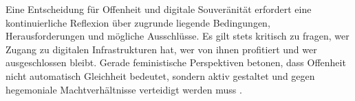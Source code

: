Eine Entscheidung für Offenheit und digitale Souveränität erfordert eine kontinuierliche Reflexion über zugrunde liegende Bedingungen, Herausforderungen und mögliche Ausschlüsse. Es gilt stets kritisch zu fragen, wer Zugang zu digitalen Infrastrukturen hat, wer von ihnen profitiert und wer ausgeschlossen bleibt. Gerade feministische Perspektiven betonen, dass Offenheit nicht automatisch Gleichheit bedeutet, sondern aktiv gestaltet und gegen hegemoniale Machtverhältnisse verteidigt werden muss \parencite{wilshireTimeRebootFeminism2024}.
